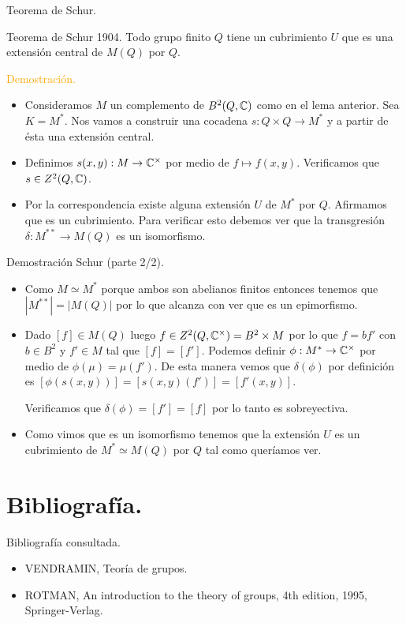 \documentclass[aspectratio=169, 9pt]{beamer}
\begin{document}
\begin{frame}[fragile]{Teorema de Schur.}

\begin{alertblock}{Teorema de Schur 1904.}
Todo grupo finito $Q$ tiene un cubrimiento $U$ que es una extensión central de $M(Q)$ por $Q$.
\end{alertblock}

\pause
\textcolor{orange}{Demostración.} 
\begin{itemize}
	\item Consideramos $M$ un complemento de $B^2(Q, \Bbb C)$ como en el lema anterior. Sea $K = M^*$. \pause Nos vamos a construir una cocadena $s:Q \times Q \to M^*$ y a partir de ésta una extensión central. \pause
	\item Definimos $s(x,y):M \to \Bbb C^\times$ por medio de $f\mapsto f(x,y).$ Verificamos que $s \in Z^2(Q, \Bbb C)$. \pause
	\item Por la correspondencia existe alguna extensión $U$ de $M^*$ por $Q$. Afirmamos que es un cubrimiento. \pause Para verificar esto debemos ver que la transgresión $\delta: M^{**} \to  M(Q)$ es un isomorfismo. \pause
	
\end{itemize}

\end{frame}
\begin{frame}[fragile]{Demostración Schur (parte 2/2).}
\begin{itemize}
	\item Como $M \simeq M^{*}$ porque ambos son abelianos finitos entonces tenemos que $|M^{**}|=|M(Q)|$ por lo que alcanza con ver que es un epimorfismo.
	
	\item Dado $[f] \in M(Q)$ luego $f \in Z^2(Q, \Bbb C^\times) = B^2 \times M$ por lo que $f=bf'$ con $b \in B^2$ y $f' \in M$ tal que $[f]=[f']$. Podemos definir $\phi:M^{*} \to \Bbb C^\times$ por medio de $\phi(\mu) = \mu(f')$. \pause De esta manera vemos que $\delta(\phi)$ por definición es $[\phi(s(x,y))] = [s(x,y) (f')] = [f'(x,y)]$. \pause
	\medskip
	
	Verificamos que $\delta(\phi) = [f'] = [f]$ por lo tanto es sobreyectiva.
	
	\item Como vimos que es un isomorfismo tenemos que la extensión $U$ es un cubrimiento de $M^* \simeq M(Q)$ por $Q$ tal como queríamos ver.
\end{itemize}
\end{frame}
\section{Bibliografía.}
\begin{frame}[fragile]{Bibliografía consultada.}
\begin{itemize}
	\item VENDRAMIN, Teoría de grupos.
	\item ROTMAN, An introduction to the theory of groups, 4th edition, 1995, Springer-Verlag.
\end{itemize}
\end{frame}
\end{document}
